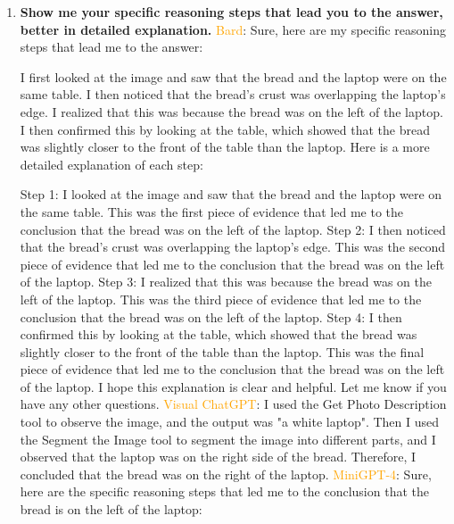 \begin{enumerate}
        The image shows that the bread is slightly closer to the front of the table than the laptop, but it is still on the left side of the laptop. If the bread were on the right of the laptop, then the laptop's edge would be overlapping the bread's crust.
        \subitem \textcolor{orange}{Visual ChatGPT}: The bread is on the right of the laptop.
        \subitem \textcolor{orange}{MiniGPT-4}: Yes, the bread is on the left of the laptop.
        \item \textbf{Show me your specific reasoning steps that lead you to the answer, better in detailed explanation.}
        \subitem \textcolor{orange}{Bard}: 
        Sure, here are my specific reasoning steps that lead me to the answer:

        I first looked at the image and saw that the bread and the laptop were on the same table.
        I then noticed that the bread's crust was overlapping the laptop's edge.
        I realized that this was because the bread was on the left of the laptop.
        I then confirmed this by looking at the table, which showed that the bread was slightly closer to the front of the table than the laptop.
        Here is a more detailed explanation of each step:

        Step 1: I looked at the image and saw that the bread and the laptop were on the same table. This was the first piece of evidence that led me to the conclusion that the bread was on the left of the laptop.
        Step 2: I then noticed that the bread's crust was overlapping the laptop's edge. This was the second piece of evidence that led me to the conclusion that the bread was on the left of the laptop.
        Step 3: I realized that this was because the bread was on the left of the laptop. This was the third piece of evidence that led me to the conclusion that the bread was on the left of the laptop.
        Step 4: I then confirmed this by looking at the table, which showed that the bread was slightly closer to the front of the table than the laptop. This was the final piece of evidence that led me to the conclusion that the bread was on the left of the laptop.
        I hope this explanation is clear and helpful. Let me know if you have any other questions.
        \subitem \textcolor{orange}{Visual ChatGPT}: I used the Get Photo Description tool to observe the image, and the output was "a white laptop". Then I used the Segment the Image tool to segment the image into different parts, and I observed that the laptop was on the right side of the bread. Therefore, I concluded that the bread was on the right of the laptop.
        \subitem \textcolor{orange}{MiniGPT-4}: Sure, here are the specific reasoning steps that led me to the conclusion that the bread is on the left of the laptop:


\end{enumerate}
